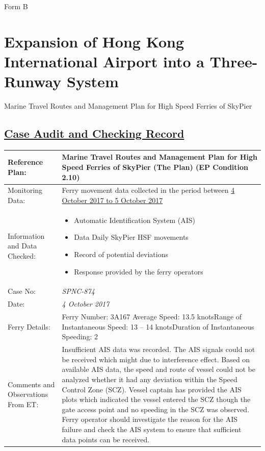 \documentclass[11pt]{book}
\begin{document}
Form B

\section{Expansion of Hong Kong International Airport into a Three-Runway System}

Marine Travel Routes and Management Plan for High Speed Ferries of SkyPier

\subsection{\ul{Case Audit and Checking Record}}

{\renewcommand{\arraystretch}{1.4}
\begin{table}[htb]
\fontsize{11pt}{15pt}\selectfont
\begin{tabular}{|>{\raggedright}p{38mm}|
p{99mm}<{\raggedright}|}\hline
Reference Plan: & Marine Travel Routes and Management Plan for High Speed Ferries of SkyPier (The Plan) (EP Condition 2.10)
\\ \hline
Monitoring Data: & Ferry movement data collected in the period between
\newline
\ul{4 October 2017 to 5 October 2017}
\\[1.0mm]\hline
Information and Data Checked: &
\begin{minipage}[t]{110mm}
\begin{itemize}
\item Automatic Identification System (AIS)
\item Data Daily SkyPier HSF movements
  \item Record of potential deviations
\item Response provided by the ferry operators
\end{itemize}\vspace*{-1.5ex}
\end{minipage}
\\\hline
Case No: & \textit{SPNC-874}
\\ \hline
Date: & \textit{4 October 2017}
\\ \hline
Ferry Details: & Ferry Number: 3A167
\newline Average Speed: 13.5 knots\newline Range of Instantaneous Speed: 13 -- 14 knots\newline Duration of Instantaneous Speeding: 2
\\ \hline
Comments and Observations \newline From ET: & Insufficient AIS data was recorded. The AIS signals could not be received which might due to interference effect. Based on available AIS data, the speed and route of vessel could not be analyzed whether it had any deviation within the Speed Control Zone (SCZ). Vessel captain has provided the AIS plots which indicated the vessel entered the SCZ though the gate access point and no speeding in the SCZ was observed. Ferry operator should investigate the reason for the AIS failure and check the AIS system to ensure that sufficient data points can be received. \\ \hline

\end{tabular}
\end{table}}
\end{document}
